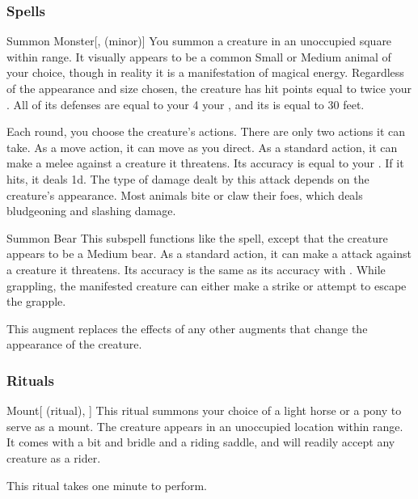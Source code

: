 \subsubsection{Spells}


\begin{ability}[\nth{1}]{Summon Monster}[,  (minor)]
You summon a creature in an unoccupied square within \rngmed range.
It visually appears to be a common Small or Medium animal of your choice, though in reality it is a manifestation of magical energy.
Regardless of the appearance and size chosen, the creature has hit points equal to twice your .
All of its defenses are equal to your 4 \add your , and its  is equal to 30 feet.

Each round, you choose the creature's actions.
There are only two actions it can take.
As a move action, it can move as you direct.
As a standard action, it can make a melee  against a creature it threatens.
Its accuracy is equal to your .
If it hits, it deals  \minus1d.
The type of damage dealt by this attack depends on the creature's appearance.
Most animals bite or claw their foes, which deals bludgeoning and slashing damage.
\end{ability}
\vspace{0.25em}



\begin{ability}[\nth{2}]{Summon Bear}
This subspell functions like the  spell, except that the creature appears to be a Medium bear.
As a standard action, it can make a  attack against a creature it threatens.
Its accuracy is the same as its accuracy with .
While grappling, the manifested creature can either make a strike or attempt to escape the grapple.

This augment replaces the effects of any other augments that change the appearance of the creature.
\end{ability}
\vspace{0.25em}



\subsubsection{Rituals}


\begin{ability}[\nth{2}]{Mount}[ (ritual), ]
This ritual summons your choice of a light horse or a pony to serve as a mount.
The creature appears in an unoccupied location within \rngclose range.
It comes with a bit and bridle and a riding saddle, and will readily accept any creature as a rider.

This ritual takes one minute to perform.
\end{ability}
\vspace{0.25em}


